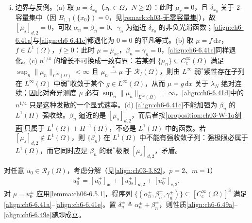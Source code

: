 \documentclass[../../main.tex]{subfiles}%
\begin{document}
\begin{remark}
\begin{enumerate}[(i)]
\item 边界与反例。(a) 取 $\mu=\delta_{x_0}$（$x_0\in\Omega$，$N\geqslant2$）：此时 $\mu_r=0$，且 $\delta_{x_0}$ 关于 $2$-容量集中（因 $B_{1,1}(\{x_0\})=0$，见\cref{remark:ch03-无零容量集}），故 $[\mu_s]_{d,2}=0$，可取 $\alpha_n=\beta_n=0$、$\gamma_n$ 为逼近 $\delta_{x_0}$ 的非负光滑函数；\eqref{align:ch6-6.41a}与\eqref{align:ch6-6.41c}都退化为 $0=0$ 的平凡等式。(b) 取 $\mu=f\,\mathrm{d}x$，$f\in L^1(\Omega)$，$f\geqslant0$：此时 $\mu=\mu_{\mathrm{ac}}$，$\beta_n=\gamma_n=0$，\eqref{align:ch6-6.41c}同样退化。(c) $n^{1/4}$ 的增长不可换成一致有界：若某列 $\{\mu_n\}\subseteq C^\infty_c(\Omega)$ 满足 $\sup_n\|\mu_n\|_{L^\infty(\Omega)}<\infty$ 且 $\mu_n\stackrel{*}{\rightharpoonup}\mu$ 于 $\mathscr{R}_f(\Omega)$，则由 $L^\infty$ 弱$^*$紧性存在子列在 $L^\infty(\Omega)$ 中弱$^*$收敛于某个 $g\in L^\infty(\Omega)$，从而 $\mu=g\,\mathrm{d}x$ 关于 $\lambda_N$ 绝对连续；因此对奇异测度 $\mu$ 必有 $\sup_n\|\mu_n\|_{L^\infty(\Omega)}=\infty$，\eqref{align:ch6-6.41d}中的 $n^{1/4}$ 只是这种发散的一个显式速率。(d) \eqref{align:ch6-6.41c}不能加强为 $\beta_n$ 的 $L^1(\Omega)$ 强收敛。$\beta_n$ 逼近的是 $[\mu_s]_{d,2}$，而后者按\cref{proposition:ch03-W-1q刻画}只属于 $L^1(\Omega)+H^{-1}(\Omega)$，不必是 $L^1(\Omega)$ 中的函数。若 $[\mu_s]_{d,2}\notin L^1(\Omega)$，则 $\{\beta_n\}$ 在 $L^1(\Omega)$ 中不能有强收敛子列：强极限必属于 $L^1(\Omega)$，而它同时应是 $\beta_n$ 的弱$^*$极限 $[\mu_s]_{d,2}$，矛盾。
\end{enumerate}
\end{remark}

\begin{remark}\label{remark:ch06-6.5.1}
对任意 $u_0\in\mathscr{R}_f(\Omega)$，考虑分解（见\eqref{align:ch03-3.82}，$p=2$、$m=1$）
\begin{align}
u^\pm_0=[u^\pm_0]_{\mathrm{ac}}+[u^\pm_{0s}]_{d,2}+[u^\pm_0]_{c,2}. \label{align:ch6-6.50}
\end{align}
对 $\mu=u^\pm_0$ 应用\cref{lemma:ch06-6.5.1}，得序列 $\{(\alpha^\pm_n,\beta^\pm_n,\gamma^\pm_n)\}\subseteq[C^\infty_c(\Omega)]^3$ 满足\eqref{align:ch6-6.41a}--\eqref{align:ch6-6.41e}。置 $\delta^\pm_n\triangleq\alpha^\pm_n+\beta^\pm_n$，则性质\eqref{align:ch6-6.49a}--\eqref{align:ch6-6.49e}随即成立。
\end{remark}
\end{document}
